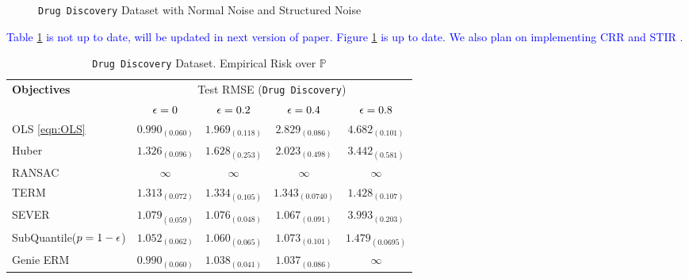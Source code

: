 \documentclass{article} %
\newcommand{\subhead}[1]{\multicolumn{1}{c}{#1}}%
\begin{document}
\begin{figure}
		\caption{\texttt{Drug Discovery} Dataset with Normal Noise and Structured Noise}
		\label{fig:drug-discovery}
	\end{figure}
	
	\textcolor{blue}{Table \ref{tab:drug-discovery} is not up to date, will be updated in next version of paper. Figure \ref{fig:drug-discovery} is up to date. We also plan on implementing CRR \cite{bhatia2017} and STIR \cite{pmlr-v89-mukhoty19a}}.
	\begin{table}[!h]
		\centering
		\begin{tabular}{lcccc}
			\toprule 
			\textbf{Objectives}&\multicolumn{4}{c}{Test RMSE (\texttt{Drug Discovery})}\\                   
			\cmidrule(rl){2-5}
			&\subhead{${\epsilon} = 0$}& \subhead{${\epsilon} = 0.2$}& \subhead{${\epsilon} = 0.4$}& \subhead{${\epsilon} = 0.8$}\\ 
			\midrule
			OLS \ref{eqn:OLS}  &$0.990_{(0.060)}$&$1.969_{(0.118)}$&$2.829_{(0.086)}$&$4.682_{(0.101)}$\\
			Huber \cite{Huber2009} &$1.326_{(0.096)}$&$1.628_{(0.253)}$&$2.023_{(0.498)}$&$3.442_{(0.581)}$\\
			RANSAC \cite{RANSAC1981} &$\infty$&$\infty$&$\infty$&$\infty$\\
			TERM \cite{li2020tilted} &$1.313_{(0.072)}$&$1.334_{(0.105)}$&$1.343_{(0.0740)}$&$\mathbf{1.428_{(0.107)}}$\\
			SEVER \cite{DiakonikolasKKLSS19} &$1.079_{(0.059)}$&$1.076_{(0.048)}$&$\mathbf{1.067_{(0.091)}}$&$3.993_{(0.203)}$\\
			\rowcolor{LightCyan}
			SubQuantile($p = 1-{\epsilon}$) &$\mathbf{1.052_{(0.062)}}$&$\mathbf{1.060_{(0.065)}}$&$1.073_{(0.101)}$&$1.479_{(0.0695)}$\\
			\midrule 
			Genie ERM &$0.990_{(0.060)}$&$1.038_{(0.041)}$&$1.037_{(0.086)}$&$\infty$\\
			\bottomrule
		\end{tabular}
		\caption{\texttt{Drug Discovery} Dataset. Empirical Risk over $\mathbb{P}$}
		\label{tab:drug-discovery}
	\end{table}
\end{document}
